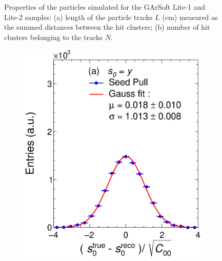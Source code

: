 \begin{figure}[t]
\begin{subfigure}[b]{0.48\textwidth}
         \caption{}
         \label{fig:MCGArLite_N}
     \end{subfigure}
        \caption{Properties of the particles simulated for the GArSoft Lite-1 and Lite-2 samples: (a) length of the particle tracks $L$ (cm) measured as the summed distances between the hit clusters; (b) number of hit clusters belonging to the tracks $N$.} \label{fig:MCGArLite_prop}
\end{figure}

\begin{figure}[t]
     \centering
     \begin{subfigure}{0.32\textwidth}
         \centering
         \includegraphics[width=\textwidth]{figures/ch4-KF_NDGArLite/MC/ALICE+KF/UnitSeed_p0.eps}
         \caption{}
         \label{fig:resp0Seed_GArLite_ALICE+KF}
     \end{subfigure}
     \begin{subfigure}{0.32\textwidth}
         \centering

\end{subfigure}
\end{figure}
